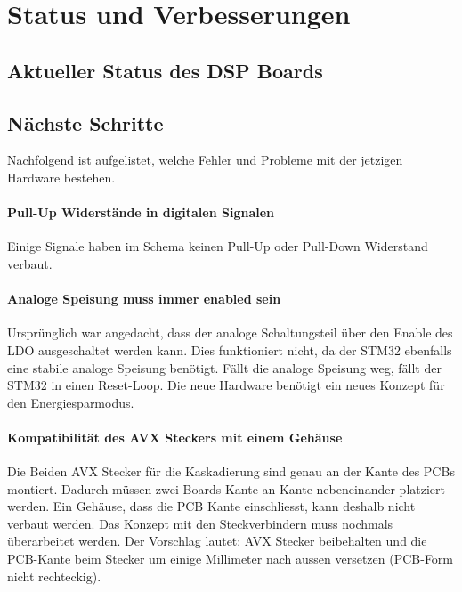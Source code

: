 \section{Status und Verbesserungen}
\label{sec:Status}

\subsection{Aktueller Status des DSP Boards}


\subsection{Nächste Schritte}

Nachfolgend ist aufgelistet, welche Fehler und Probleme mit der jetzigen Hardware bestehen.

\paragraph{Pull-Up Widerstände in digitalen Signalen}

Einige Signale haben im Schema keinen Pull-Up oder Pull-Down Widerstand verbaut.


\paragraph{Analoge Speisung muss immer enabled sein}

Ursprünglich war angedacht, dass der analoge Schaltungsteil über den Enable des LDO ausgeschaltet werden kann. Dies funktioniert nicht, da der STM32 ebenfalls eine stabile analoge Speisung benötigt. Fällt die analoge Speisung weg, fällt der STM32 in einen Reset-Loop.
Die neue Hardware benötigt ein neues Konzept für den Energiesparmodus.

\paragraph{Kompatibilität des AVX Steckers mit einem Gehäuse}

Die Beiden AVX Stecker für die Kaskadierung sind genau an der Kante des PCBs montiert. Dadurch müssen zwei Boards Kante an Kante nebeneinander platziert werden.
Ein Gehäuse, dass die PCB Kante einschliesst, kann deshalb nicht verbaut werden.
Das Konzept mit den Steckverbindern muss nochmals überarbeitet werden.
Der Vorschlag lautet: AVX Stecker beibehalten und die PCB-Kante beim Stecker um einige Millimeter nach aussen versetzen (PCB-Form nicht rechteckig).

